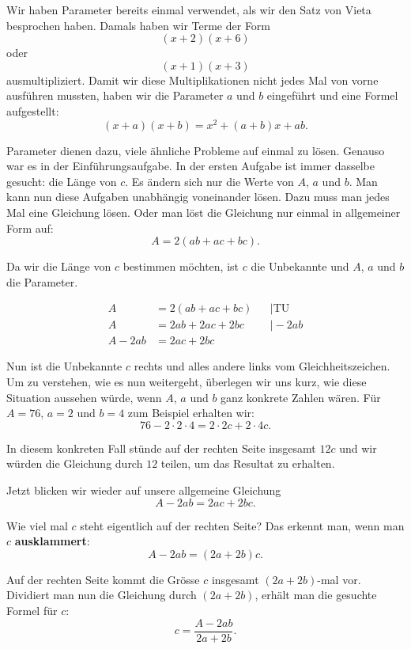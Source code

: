 \clearpage
Wir haben Parameter bereits einmal verwendet, als wir den Satz von Vieta besprochen haben. Damals haben wir Terme der Form
\[
    (x+2)(x+6)
\]
oder
\[
    (x+1)(x+3)
\]
ausmultipliziert. Damit wir diese Multiplikationen nicht jedes Mal von vorne ausführen mussten, haben wir die Parameter \(a\) und \(b\) eingeführt und eine Formel aufgestellt:
\[
    (x+a)(x+b)=x^2+(a+b)x+ab.
\]

Parameter dienen dazu, viele ähnliche Probleme auf einmal zu lösen. Genauso war es in der Einführungsaufgabe. In der ersten Aufgabe ist immer dasselbe gesucht: die Länge von \(c\). Es ändern sich nur die Werte von \(A\), \(a\) und \(b\). Man kann nun diese Aufgaben unabhängig voneinander lösen. Dazu muss man jedes Mal eine Gleichung lösen. Oder man löst die Gleichung nur einmal in allgemeiner Form auf:
\[
    A=2(ab+ac+bc).
\]

Da wir die Länge von \(c\) bestimmen möchten, ist \(c\) die Unbekannte und \(A\), \(a\) und \(b\) die Parameter.

\[
    \begin{aligned}
        A     & = 2(ab+ac+bc) &  & \mid \text{TU} \\
        A     & = 2ab+2ac+2bc &  & \mid -2ab      \\
        A-2ab & = 2ac+2bc
    \end{aligned}
\]

Nun ist die Unbekannte \(c\) rechts und alles andere links vom Gleichheitszeichen. Um zu verstehen, wie es nun weitergeht, überlegen wir uns kurz, wie diese Situation aussehen würde, wenn \(A\), \(a\) und \(b\) ganz konkrete Zahlen wären. Für \(A=76\), \(a=2\) und \(b=4\) zum Beispiel erhalten wir:
\[
    76-2\cdot2\cdot4=2\cdot2c+2\cdot4c.
\]

In diesem konkreten Fall stünde auf der rechten Seite insgesamt \(12c\) und wir würden die Gleichung durch \(12\) teilen, um das Resultat zu erhalten.

Jetzt blicken wir wieder auf unsere allgemeine Gleichung
\[
    A-2ab=2ac+2bc.
\]

Wie viel mal \(c\) steht eigentlich auf der rechten Seite? Das erkennt man, wenn man \(c\) \textbf{ausklammert}:
\[
    A-2ab=(2a+2b)c.
\]

Auf der rechten Seite kommt die Grösse \(c\) insgesamt \((2a+2b)\)-mal vor. Dividiert man nun die Gleichung durch \((2a+2b)\), erhält man die gesuchte Formel für \(c\):
\[
    c=\frac{A-2ab}{2a+2b}.
\]

